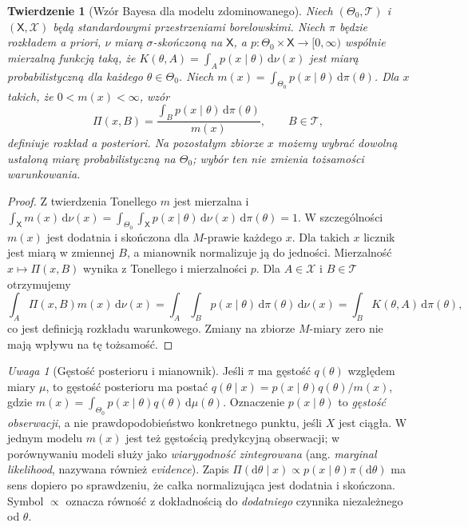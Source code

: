 \documentclass[11pt,a4paper,oneside]{report}
\numberwithin{equation}{chapter}
\theoremstyle{plain}
\newtheorem{twierdzenie}{Twierdzenie}[chapter]
\theoremstyle{definition}
\theoremstyle{remark}
\newtheorem{uwaga}{Uwaga}[chapter]
\newcommand{\dd}{\mathrm d}
\begin{document}
\begin{twierdzenie}[Wzór Bayesa dla modelu zdominowanego]
\label{thm:bayes-dominated}
Niech $(\Theta_0,\mathcal T)$ i $(\mathsf X,\mathcal X)$ będą
standardowymi przestrzeniami borelowskimi. Niech $\pi$ będzie
rozkładem a priori, $\nu$ miarą $\sigma$-skończoną na $\mathsf X$,
a $p:\Theta_0\times\mathsf X\to[0,\infty)$ wspólnie mierzalną
funkcją taką, że
$K(\theta,A)=\int_A p(x\mid\theta)\,\dd\nu(x)$
jest miarą probabilistyczną dla każdego $\theta\in\Theta_0$.
Niech $m(x)=\int_{\Theta_0}p(x\mid\theta)\,\dd\pi(\theta)$.
Dla $x$ takich, że $0<m(x)<\infty$, wzór
\[
 \Pi(x,B)=\frac{\int_B p(x\mid\theta)\,\dd\pi(\theta)}{m(x)},
 \qquad B\in\mathcal T,
\]
definiuje rozkład a posteriori. Na pozostałym zbiorze $x$ możemy
wybrać dowolną ustaloną miarę probabilistyczną na $\Theta_0$;
wybór ten nie zmienia tożsamości warunkowania.
\end{twierdzenie}
\begin{proof}
Z twierdzenia Tonellego $m$ jest mierzalna i
$\int_{\mathsf X}m(x)\,\dd\nu(x)=
\int_{\Theta_0}\int_{\mathsf X}p(x\mid\theta)\,\dd\nu(x)\,\dd\pi(\theta)=1$.
W szczególności $m(x)$ jest dodatnia i skończona dla
$M$-prawie każdego $x$. Dla takich $x$ licznik jest miarą w
zmiennej $B$, a mianownik normalizuje ją do jedności.
Mierzalność $x\mapsto\Pi(x,B)$ wynika z Tonellego i mierzalności
$p$. Dla $A\in\mathcal X$ i $B\in\mathcal T$ otrzymujemy
\[
 \int_A\Pi(x,B)m(x)\,\dd\nu(x)
 =\int_A\int_B p(x\mid\theta)\,\dd\pi(\theta)\,\dd\nu(x)
 =\int_BK(\theta,A)\,\dd\pi(\theta),
\]
co jest definicją rozkładu warunkowego. Zmiany na zbiorze
$M$-miary zero nie mają wpływu na tę tożsamość.
\end{proof}

\begin{uwaga}[Gęstość posterioru i mianownik]
Jeśli $\pi$ ma gęstość $q(\theta)$ względem miary $\mu$,
to gęstość posterioru ma postać
$q(\theta\mid x)=p(x\mid\theta)q(\theta)/m(x)$,
gdzie $m(x)=\int_{\Theta_0}p(x\mid\theta)q(\theta)\,\dd\mu(\theta)$.
Oznaczenie $p(x\mid\theta)$ to \emph{gęstość obserwacji}, a nie
prawdopodobieństwo konkretnego punktu, jeśli $X$ jest ciągła.
W jednym modelu $m(x)$ jest też gęstością predykcyjną obserwacji;
w porównywaniu modeli służy jako \emph{wiarygodność zintegrowana}
(ang. \emph{marginal likelihood}, nazywana również \emph{evidence}).
Zapis $\Pi(\dd\theta\mid x)\propto p(x\mid\theta)\pi(\dd\theta)$
ma sens dopiero po sprawdzeniu, że całka normalizująca jest dodatnia
i skończona. Symbol $\propto$ oznacza równość z dokładnością do
\emph{dodatniego} czynnika niezależnego od $\theta$.
\end{uwaga}
\end{document}
